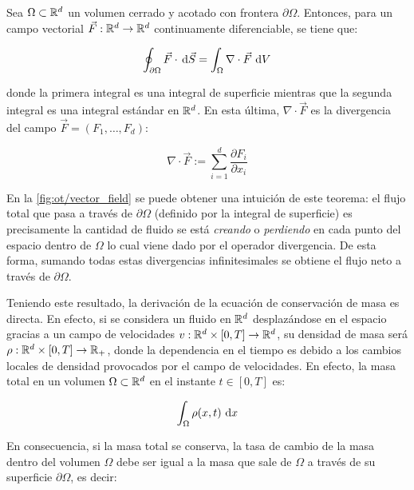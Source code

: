 \begin{teo}
	\label{teo:gauss}
	Sea $\Omega\subset\mathbb{R}^d$ un volumen cerrado y acotado con frontera $\partial\Omega$. Entonces, para un campo vectorial $\vec{F}:\mathbb{R}^d\to\mathbb{R}^d$ continuamente diferenciable, se tiene que:

	\begin{equation}
		\oint_{\partial\Omega} \vec{F} \cdot \,\operatorname{d}\! \vec{S}
		= \int_\Omega \nabla\cdot \vec{F} \,\operatorname{d}\! V
	\end{equation}
	
	donde la primera integral es una integral de superficie mientras que la segunda integral es una integral estándar en $\mathbb{R}^d$. En esta última, $\nabla\cdot \vec{F}$ es la divergencia del campo $\vec{F} = (F_1,\ldots,F_d)$:

	\begin{equation}
		\nabla\cdot \vec{F} := \sum_{i=1}^d \frac{\partial F_i}{\partial x_i}
	\end{equation}

\end{teo}

En la \autoref{fig:ot/vector_field} se puede obtener una intuición de este teorema: el flujo total que pasa a través de $\partial\Omega$ (definido por la integral de superficie) es precisamente la cantidad de fluido se está \textit{creando} o \textit{perdiendo} en cada punto del espacio dentro de $\Omega$ lo cual viene dado por el operador divergencia. De esta forma, sumando todas estas divergencias infinitesimales se obtiene el flujo neto a través de $\partial\Omega$. 


Teniendo este resultado, la derivación de la ecuación de conservación de masa es directa. En efecto, si se considera un fluido en $\mathbb{R}^d$ desplazándose en el espacio gracias a un campo de velocidades $v:\mathbb{R}^d\times[0,T]\to\mathbb{R}^d$, su densidad de masa será $\rho:\mathbb{R}^d\times[0,T]\to\mathbb{R}_+$, donde la dependencia en el tiempo es debido a los cambios locales de densidad provocados por el campo de velocidades. En efecto, la masa total en un volumen $\Omega\subset\mathbb{R}^d$ en el instante $t\in[0,T]$ es:

\begin{equation}
	\int_\Omega \rho(x,t) \,\operatorname{d}\! x
\end{equation}

En consecuencia, si la masa total se conserva, la tasa de cambio de la masa dentro del volumen $\Omega$ debe ser igual a la masa que sale de $\Omega$ a través de su superficie $\partial\Omega$, es decir:

